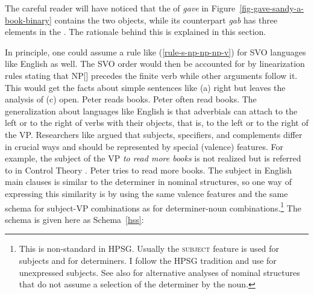 \documentclass[output=paper]{langsci/langscibook}
\begin{document}
The careful reader will have noticed that the \compsl of \emph{gave} in Figure~\ref{fig-gave-sandy-a-book-binary} contains the
two objects, while its  counterpart \emph{gab} has three elements in the \compsl. The
rationale behind this is explained in this section.

In principle, one could assume a rule like (\ref{rule-s-np-np-np-v}) for SVO languages like English
as well. The SVO order would then be accounted for by linearization rules stating that
NP[] precedes the finite verb while other arguments follow it. This would get the facts
about simple sentences like (a) right but leaves the analysis of (c) open.
\eal
\ex Peter reads books.
\ex Peter often read books.
\zl
The generalization about languages like English is that adverbials can attach to the left or to the
right of verbs with their objects, that is, to the left or to the right of the VP. Researchers like
\citet{Borsley87a} argued that subjects, specifiers, and complements differ in crucial ways and
should be represented by special (valence) features. For example, the subject of the VP \emph{to read
 more books} is not realized but is referred to in Control Theory .
\ea
Peter tries to read more books.
\z 
The subject in English main clauses is similar to the determiner in nominal structures, so one
way of expressing this similarity is by using the same valence features and the same schema for
subject-VP combinations as for determiner-noun combinations.\footnote{
  This is non-standard in HPSG. Usually the \textsc{subject} feature is used for subjects and \spr
  for determiners. I follow the  HPSG tradition and use \subj for unexpressed subjects. See
  also  for alternative analyses of nominal structures that do not assume a
  selection of the determiner by the noun.%
}
The schema is given here as Schema~\ref{hss}:
\end{document}
